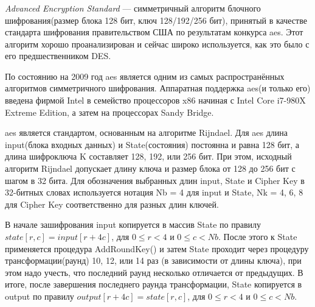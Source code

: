 \subsubsection{}
\label{sec:analysis:research:crypto:aes}

\emph{Advanced Encryption Standard} --- симметричный алгоритм блочного шифрования(размер блока 128 бит, ключ 128/192/256 бит), принятый в качестве стандарта шифрования правительством США по результатам конкурса \gls{aes}. Этот алгоритм хорошо проанализирован и сейчас широко используется, как это было с его предшественником DES. \cite{wiki:aes}

По состоянию на 2009 год \gls{aes} является одним из самых распространённых алгоритмов симметричного шифрования. \cite{thg:aes} Аппаратная поддержка \gls{aes}(и только его) введена фирмой Intel в семейство процессоров x86 начиная с Intel Core i7-980X Extreme Edition, а затем на процессорах Sandy Bridge.

\gls{aes} является стандартом, основанным на алгоритме Rijndael. Для \gls{aes} длина input(блока входных данных) и State(состояния) постоянна и равна 128 бит, а длина шифроключа K составляет 128, 192, или 256 бит. При этом, исходный алгоритм Rijndael допускает длину ключа и размер блока от 128 до 256 бит с шагом в 32 бита. Для обозначения выбранных длин input, State и Cipher Key в 32-битных словах используется нотация Nb = 4 для input и State, Nk = 4, 6, 8 для Cipher Key соответственно для разных длин ключей.

В начале зашифрования input копируется в массив State по правилу \(state[r,c]=input[r+4c]\), для \(0 \leq r < 4\) и \(0 \leq c < Nb\). После этого к State применяется процедура AddRoundKey() и затем State проходит через процедуру трансформации(раунд) 10, 12, или 14 раз (в зависимости от длины ключа), при этом надо учесть, что последний раунд несколько отличается от предыдущих. В итоге, после завершения последнего раунда трансформации, State копируется в output по правилу \(output[r+4c]=state[r,c]\), для \(0 \leq r < 4\) и \(0 \leq c < Nb\).